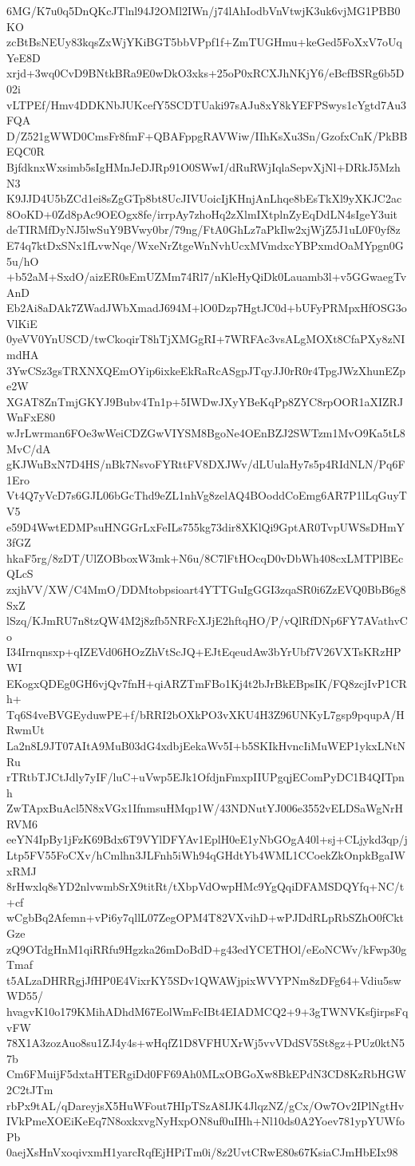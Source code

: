 6MG/K7u0q5DnQKcJTlnl94J2OMl2IWn/j74lAhIodbVnVtwjK3uk6vjMG1PBB0KO
zcBtBsNEUy83kqsZxWjYKiBGT5bbVPpf1f+ZmTUGHmu+keGed5FoXxV7oUqYeE8D
xrjd+3wq0CvD9BNtkBRa9E0wDkO3xks+25oP0xRCXJhNKjY6/eBcfBSRg6b5D02i
vLTPEf/Hmv4DDKNbJUKcefY5SCDTUaki97sAJu8xY8kYEFPSwys1cYgtd7Au3FQA
D/Z521gWWD0CmsFr8fmF+QBAFppgRAVWiw/IIhKsXu3Sn/GzofxCnK/PkBBEQC0R
BjfdknxWxsimb5sIgHMnJeDJRp91O0SWwI/dRuRWjIqlaSepvXjNl+DRkJ5MzhN3
K9JJD4U5bZCd1ei8sZgGTp8bt8UcJIVUoicIjKHnjAnLhqe8bEsTkXl9yXKJC2ac
8OoKD+0Zd8pAc9OEOgx8fe/irrpAy7zhoHq2zXlmIXtplnZyEqDdLN4sIgeY3uit
deTIRMfDyNJ5lwSuY9BVwy0br/79ng/FtA0GhLz7aPkIlw2xjWjZ5J1uL0F0yf8z
E74q7ktDxSNx1fLvwNqe/WxeNrZtgeWnNvhUcxMVmdxcYBPxmdOaMYpgn0G5u/hO
+b52aM+SxdO/aizER0sEmUZMm74Rl7/nKleHyQiDk0Lauamb3l+v5GGwaegTvAnD
Eb2Ai8aDAk7ZWadJWbXmadJ694M+lO0Dzp7HgtJC0d+bUFyPRMpxHfOSG3oVlKiE
0yeVV0YnUSCD/twCkoqirT8hTjXMGgRI+7WRFAc3vsALgMOXt8CfaPXy8zNImdHA
3YwCSz3gsTRXNXQEmOYip6ixkeEkRaRcASgpJTqyJJ0rR0r4TpgJWzXhunEZpe2W
XGAT8ZnTmjGKYJ9Bubv4Tn1p+5IWDwJXyYBeKqPp8ZYC8rpOOR1aXIZRJWnFxE80
wJrLwrman6FOe3wWeiCDZGwVIYSM8BgoNe4OEnBZJ2SWTzm1MvO9Ka5tL8MvC/dA
gKJWuBxN7D4HS/nBk7NsvoFYRttFV8DXJWv/dLUulaHy7s5p4RIdNLN/Pq6F1Ero
Vt4Q7yVcD7s6GJL06bGcThd9eZL1nhVg8zelAQ4BOoddCoEmg6AR7P1lLqGuyTV5
e59D4WwtEDMPsuHNGGrLxFeILs755kg73dir8XKlQi9GptAR0TvpUWSsDHmY3fGZ
hkaF5rg/8zDT/UlZOBboxW3mk+N6u/8C7lFtHOcqD0vDbWh408cxLMTPlBEcQLcS
zxjhVV/XW/C4MmO/DDMtobpsioart4YTTGuIgGGI3zqaSR0i6ZzEVQ0BbB6g8SxZ
lSzq/KJmRU7n8tzQW4M2j8zfb5NRFcXJjE2hftqHO/P/vQlRfDNp6FY7AVathvCo
I34Irnqnsxp+qIZEVd06HOzZhVtScJQ+EJtEqeudAw3bYrUbf7V26VXTsKRzHPWI
EKogxQDEg0GH6vjQv7fnH+qiARZTmFBo1Kj4t2bJrBkEBpsIK/FQ8zcjIvP1CRh+
Tq6S4veBVGEyduwPE+f/bRRI2bOXkPO3vXKU4H3Z96UNKyL7gsp9pqupA/HRwmUt
La2n8L9JT07AItA9MuB03dG4xdbjEekaWv5I+b5SKIkHvncIiMuWEP1ykxLNtNRu
rTRtbTJCtJdly7yIF/luC+uVwp5EJk1OfdjnFmxpIIUPgqjEComPyDC1B4QITpnh
ZwTApxBuAcl5N8xVGx1IfnmsuHMqp1W/43NDNutYJ006e3552vELDSaWgNrHRVM6
eeYN4IpBy1jFzK69Bdx6T9VYlDFYAv1EplH0eE1yNbGOgA40l+sj+CLjykd3qp/j
Ltp5FV55FoCXv/hCmlhn3JLFnh5iWh94qGHdtYb4WML1CCoekZkOnpkBgaIWxRMJ
8rHwxlq8sYD2nlvwmbSrX9titRt/tXbpVdOwpHMc9YgQqiDFAMSDQYfq+NC/t+cf
wCgbBq2Afemn+vPi6y7qllL07ZegOPM4T82VXvihD+wPJDdRLpRbSZhO0fCktGze
zQ9OTdgHnM1qiRRfu9Hgzka26mDoBdD+g43edYCETHOl/eEoNCWv/kFwp30gTmaf
t5ALzaDHRRgjJfHP0E4VixrKY5SDv1QWAWjpixWVYPNm8zDFg64+Vdiu5swWD55/
hvagvK10o179KMihADhdM67EolWmFcIBt4EIADMCQ2+9+3gTWNVKsfjirpsFqvFW
78X1A3zozAuo8su1ZJ4y4s+wHqfZ1D8VFHUXrWj5vvVDdSV5St8gz+PUz0ktN57b
Cm6FMuijF5dxtaHTERgiDd0FF69Ah0MLxOBGoXw8BkEPdN3CD8KzRbHGW2C2tJTm
rbPx9tAL/qDareyjsX5HuWFout7HIpTSzA8IJK4JlqzNZ/gCx/Ow7Ov2IPlNgtHv
IVkPmeXOEiKeEq7N8oxkxvgNyHxpON8uf0uIHh+Nl10ds0A2Yoev781ypYUWfoPb
0aejXsHnVxoqivxmH1yarcRqfEjHPiTm0i/8z2UvtCRwE80s67KsiaCJmHbEIx98
